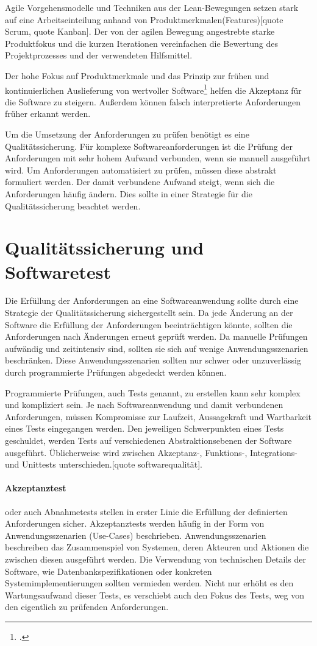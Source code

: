 Agile Vorgehensmodelle und Techniken aus der Lean-Bewegungen setzen stark auf eine Arbeitseinteilung anhand von Produktmerkmalen(Features)[quote Scrum, quote Kanban]. Der von der agilen Bewegung angestrebte starke Produktfokus und die kurzen Iterationen vereinfachen die Bewertung des Projektprozesses und der verwendeten Hilfsmittel.

Der hohe Fokus auf Produktmerkmale und das Prinzip zur frühen und kontinuierlichen Auslieferung von wertvoller Software\footcite{agile-manifest-principles} helfen die Akzeptanz für die Software zu steigern. Außerdem können falsch interpretierte Anforderungen früher erkannt werden. 

Um die Umsetzung der Anforderungen zu prüfen benötigt es eine Qualitätssicherung. Für komplexe Softwareanforderungen ist die Prüfung der Anforderungen mit sehr hohem Aufwand verbunden, wenn sie manuell ausgeführt wird. Um Anforderungen automatisiert zu prüfen, müssen diese abstrakt formuliert werden. Der damit verbundene Aufwand steigt, wenn sich die Anforderungen häufig ändern. Dies sollte in einer Strategie für die Qualitätssicherung beachtet werden. 

\section{Qualitätssicherung und Softwaretest}

Die Erfüllung der Anforderungen an eine Softwareanwendung sollte durch eine Strategie der Qualitätssicherung sichergestellt sein. Da jede Änderung an der Software die Erfüllung der Anforderungen beeinträchtigen könnte, sollten die Anforderungen nach Änderungen erneut geprüft werden. Da manuelle Prüfungen aufwändig und zeitintensiv sind, sollten sie sich auf wenige Anwendungsszenarien beschränken. Diese Anwendungsszenarien sollten nur schwer oder unzuverlässig durch programmierte Prüfungen abgedeckt werden können.

Programmierte Prüfungen, auch Tests genannt, zu erstellen kann sehr komplex und kompliziert sein. Je nach Softwareanwendung und damit verbundenen Anforderungen, müssen Kompromisse zur Laufzeit, Aussagekraft und Wartbarkeit eines Tests eingegangen werden.
Den jeweiligen Schwerpunkten eines Tests geschuldet, werden Tests auf verschiedenen Abstraktionsebenen der Software ausgeführt. Üblicherweise wird zwischen Akzeptanz-, Funktions-, Integrations- und Unittests unterschieden.[quote softwarequalität]. 

\paragraph{Akzeptanztest}
oder auch Abnahmetests stellen in erster Linie die Erfüllung der definierten Anforderungen sicher. Akzeptanztests werden häufig in der Form von Anwendungsszenarien (Use-Cases) beschrieben. Anwendungsszenarien beschreiben das Zusammenspiel von Systemen, deren Akteuren und Aktionen die zwischen diesen ausgeführt werden. Die Verwendung von technischen Details der Software, wie Datenbankspezifikationen oder konkreten Systemimplementierungen sollten vermieden werden. Nicht nur erhöht es den Wartungsaufwand dieser Tests, es verschiebt auch den Fokus des Tests, weg von den eigentlich zu prüfenden Anforderungen.

